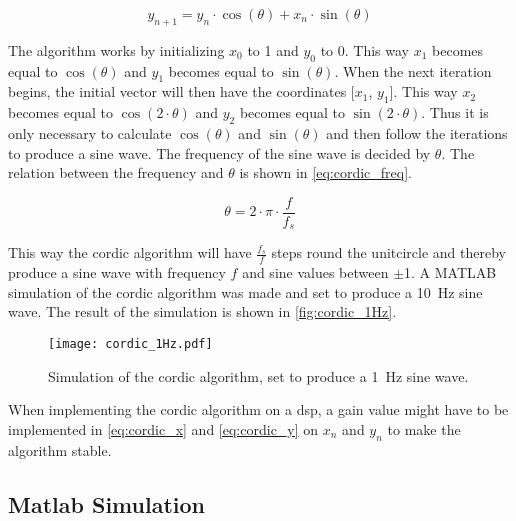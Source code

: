 \begin{equation}
\label{eq:cordic_y}
		y_{n+1} = y_n \cdot \cos(\theta) + x_n \cdot \sin(\theta) 
\end{equation}
\startexplain
\stopexplain

The algorithm works by initializing $x_0$ to 1 and $y_0$ to 0. This way $x_1$ becomes equal to $\cos(\theta)$ and $y_1$ becomes equal to $\sin(\theta)$. When the next iteration begins, the initial vector will then have the coordinates [$x_1$, $y_1$]. This way $x_2$ becomes equal to $\cos(2 \cdot \theta)$ and $y_2$ becomes equal to $\sin(2 \cdot \theta)$. Thus it is only necessary to calculate $\cos(\theta)$ and $\sin(\theta)$ and then follow the iterations to produce a sine wave. The frequency of the sine wave is decided by $\theta$. The relation between the frequency and $\theta$ is shown in \autoref{eq:cordic_freq}.

\begin{equation}
\label{eq:cordic_freq}
		\theta = 2 \cdot \pi \cdot \frac{f}{f_s} 
\end{equation}
\startexplain
\stopexplain 

This way the \gls{cordic} algorithm will have $\frac{f_s}{f}$ steps round the unitcircle and thereby produce a sine wave with frequency $f$ and sine values between $\pm$1.
A MATLAB simulation of the \gls{cordic} algorithm was made and set to produce a \SI{10}{\hertz} sine wave. The result of the simulation is shown in \autoref{fig:cordic_1Hz}.

\begin{figure}[!h]
    \centering
        \texttt{[image: cordic\_1Hz.pdf]}
        \caption{Simulation of the \gls{cordic} algorithm, set to produce a \SI{1}{\hertz} sine wave.}
        \label{fig:cordic_1Hz}
  \end{figure}
  
When implementing the \gls{cordic} algorithm on a \gls{dsp}, a gain value might have to be implemented in \autoref{eq:cordic_x} and \autoref{eq:cordic_y} on $x_n$ and $y_n$ to make the algorithm stable. 

\subsection{Matlab Simulation}






